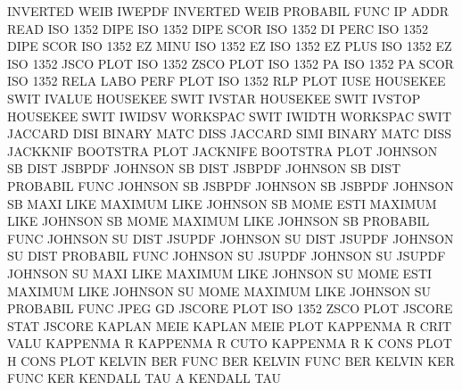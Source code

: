 INVERTED WEIB                           IWEPDF
INVERTED WEIB                           PROBABIL FUNC
IP       ADDR                           READ
ISO      1352 DIPE                      ISO      1352 DIPE SCOR
ISO      1352 DI   PERC                 ISO      1352 DIPE SCOR
ISO      1352 EZ   MINU                 ISO      1352 EZ
ISO      1352 EZ   PLUS                 ISO      1352 EZ
ISO      1352 JSCO PLOT                 ISO      1352 ZSCO PLOT
ISO      1352 PA                        ISO      1352 PA   SCOR
ISO      1352 RELA LABO PERF PLOT       ISO      1352 RLP  PLOT
IUSE                                    HOUSEKEE SWIT
IVALUE                                  HOUSEKEE SWIT
IVSTAR                                  HOUSEKEE SWIT
IVSTOP                                  HOUSEKEE SWIT
IWIDSV                                  WORKSPAC SWIT
IWIDTH                                  WORKSPAC SWIT
JACCARD  DISI                           BINARY   MATC DISS
JACCARD  SIMI                           BINARY   MATC DISS
JACKKNIF                                BOOTSTRA PLOT
JACKNIFE                                BOOTSTRA PLOT
JOHNSON  SB   DIST                      JSBPDF
JOHNSON  SB   DIST                      JSBPDF
JOHNSON  SB   DIST                      PROBABIL FUNC
JOHNSON  SB                             JSBPDF
JOHNSON  SB                             JSBPDF
JOHNSON  SB   MAXI LIKE                 MAXIMUM  LIKE
JOHNSON  SB   MOME ESTI                 MAXIMUM  LIKE
JOHNSON  SB   MOME                      MAXIMUM  LIKE
JOHNSON  SB                             PROBABIL FUNC
JOHNSON  SU   DIST                      JSUPDF
JOHNSON  SU   DIST                      JSUPDF
JOHNSON  SU   DIST                      PROBABIL FUNC
JOHNSON  SU                             JSUPDF
JOHNSON  SU                             JSUPDF
JOHNSON  SU   MAXI LIKE                 MAXIMUM  LIKE
JOHNSON  SU   MOME ESTI                 MAXIMUM  LIKE
JOHNSON  SU   MOME                      MAXIMUM  LIKE
JOHNSON  SU                             PROBABIL FUNC
JPEG                                    GD
JSCORE   PLOT                           ISO      1352 ZSCO PLOT
JSCORE   STAT                           JSCORE
KAPLAN   MEIE                           KAPLAN   MEIE PLOT
KAPPENMA R    CRIT VALU                 KAPPENMA R
KAPPENMA R    CUTO                      KAPPENMA R
K        CONS PLOT                      H        CONS PLOT
KELVIN   BER  FUNC                      BER
KELVIN   FUNC                           BER
KELVIN   KER  FUNC                      KER
KENDALL  TAU  A                         KENDALL  TAU
